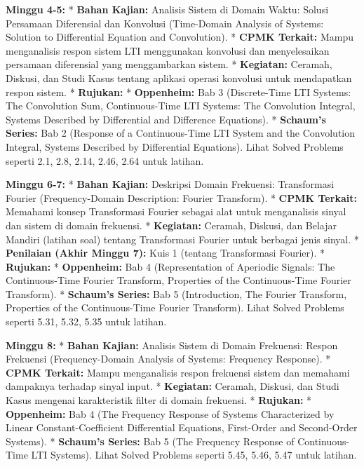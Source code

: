 \documentclass[
  letterpaper,
  DIV=11,
  numbers=noendperiod]{scrreprt}
\begin{document}
\textbf{Minggu 4-5:} * \textbf{Bahan Kajian:} Analisis Sistem di Domain
Waktu: Solusi Persamaan Diferensial dan Konvolusi (Time-Domain Analysis
of Systems: Solution to Differential Equation and Convolution). *
\textbf{CPMK Terkait:} Mampu menganalisis respon sistem LTI menggunakan
konvolusi dan menyelesaikan persamaan diferensial yang menggambarkan
sistem. * \textbf{Kegiatan:} Ceramah, Diskusi, dan Studi Kasus tentang
aplikasi operasi konvolusi untuk mendapatkan respon sistem. *
\textbf{Rujukan:} * \textbf{Oppenheim:} Bab 3 (Discrete-Time LTI
Systems: The Convolution Sum, Continuous-Time LTI Systems: The
Convolution Integral, Systems Described by Differential and Difference
Equations). * \textbf{Schaum's Series:} Bab 2 (Response of a
Continuous-Time LTI System and the Convolution Integral, Systems
Described by Differential Equations). Lihat Solved Problems seperti 2.1,
2.8, 2.14, 2.46, 2.64 untuk latihan.

\textbf{Minggu 6-7:} * \textbf{Bahan Kajian:} Deskripsi Domain
Frekuensi: Transformasi Fourier (Frequency-Domain Description: Fourier
Transform). * \textbf{CPMK Terkait:} Memahami konsep Transformasi
Fourier sebagai alat untuk menganalisis sinyal dan sistem di domain
frekuensi. * \textbf{Kegiatan:} Ceramah, Diskusi, dan Belajar Mandiri
(latihan soal) tentang Transformasi Fourier untuk berbagai jenis sinyal.
* \textbf{Penilaian (Akhir Minggu 7):} Kuis 1 (tentang Transformasi
Fourier). * \textbf{Rujukan:} * \textbf{Oppenheim:} Bab 4
(Representation of Aperiodic Signals: The Continuous-Time Fourier
Transform, Properties of the Continuous-Time Fourier Transform). *
\textbf{Schaum's Series:} Bab 5 (Introduction, The Fourier Transform,
Properties of the Continuous-Time Fourier Transform). Lihat Solved
Problems seperti 5.31, 5.32, 5.35 untuk latihan.

\textbf{Minggu 8:} * \textbf{Bahan Kajian:} Analisis Sistem di Domain
Frekuensi: Respon Frekuensi (Frequency-Domain Analysis of Systems:
Frequency Response). * \textbf{CPMK Terkait:} Mampu menganalisis respon
frekuensi sistem dan memahami dampaknya terhadap sinyal input. *
\textbf{Kegiatan:} Ceramah, Diskusi, dan Studi Kasus mengenai
karakteristik filter di domain frekuensi. * \textbf{Rujukan:} *
\textbf{Oppenheim:} Bab 4 (The Frequency Response of Systems
Characterized by Linear Constant-Coefficient Differential Equations,
First-Order and Second-Order Systems). * \textbf{Schaum's Series:} Bab 5
(The Frequency Response of Continuous-Time LTI Systems). Lihat Solved
Problems seperti 5.45, 5.46, 5.47 untuk latihan.
\end{document}

